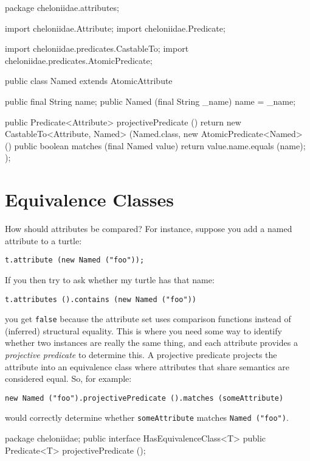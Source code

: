 \documentclass{report}
\begin{document}
\begin{javacode}
package cheloniidae.attributes;

import cheloniidae.Attribute;
import cheloniidae.Predicate;

import cheloniidae.predicates.CastableTo;
import cheloniidae.predicates.AtomicPredicate;

public class Named extends AtomicAttribute {
  public final String name;
  public Named (final String _name) {name = _name;}
  
  public Predicate<Attribute> projectivePredicate () {
    return new CastableTo<Attribute, Named> (Named.class, new AtomicPredicate<Named> () {
      public boolean matches (final Named value) {return value.name.equals (name);}
    });
  }
}
\end{javacode}

\section {Equivalence Classes} \label{sec:equivalence-classes}
      How should attributes be compared? For instance, suppose you add a named attribute to a turtle:

\begin{verbatim}
t.attribute (new Named ("foo"));
\end{verbatim}

      If you then try to ask whether my turtle has that name:

\begin{verbatim}
t.attributes ().contains (new Named ("foo"))
\end{verbatim}

      \noindent you get {\tt false} because the attribute set uses comparison functions instead of (inferred) structural equality. This is where you need some
      way to identify whether two instances are really the same thing, and each attribute provides a {\em projective predicate} to determine this. A projective
      predicate projects the attribute into an equivalence class where attributes that share semantics are considered equal. So, for example:

\begin{verbatim}
new Named ("foo").projectivePredicate ().matches (someAttribute)
\end{verbatim}

      \noindent would correctly determine whether {\tt someAttribute} matches \verb|Named ("foo")|.

\begin{javacode}
package cheloniidae;
public interface HasEquivalenceClass<T> {
  public Predicate<T> projectivePredicate ();
}
\end{javacode}
\end{document}
